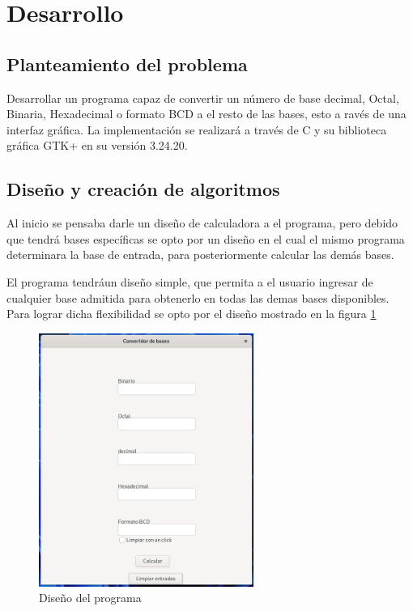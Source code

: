 \documentclass[letterpaper,12pt]{extarticle}%
\begin{document}
    
		
	\section{Desarrollo}
	\subsection{Planteamiento del problema}
		Desarrollar un programa capaz de convertir un número de base decimal,
		Octal, Binaria, Hexadecimal o formato BCD a el resto de las bases, esto
		a ravés de una interfaz	gráfica. La implementación se realizará a través
		de C y su biblioteca gráfica GTK+ en su versión 3.24.20.

	\subsection{Diseño y creación de algoritmos}
		Al inicio se pensaba darle un diseño de calculadora a el programa, pero 
		debido que tendrá bases específicas se opto por un diseño en el cual el 
		mismo programa determinara la base de entrada, para posteriormente calcular
		las demás bases.

		El programa tendráun diseño simple, que permita a el usuario ingresar
		de cualquier base admitida para obtenerlo en todas las demas bases 
		disponibles. Para lograr dicha flexibilidad se opto por el diseño
		mostrado en la figura \ref{ProgramDesign}

		\begin{figure}[H]
		\begin{center}
		\includegraphics[width=7cm]{imag//ProgramDesign.png}
		\caption{Diseño del programa}
		\label{ProgramDesign}
		\end{center}
 		\end{figure}
\end{document}
